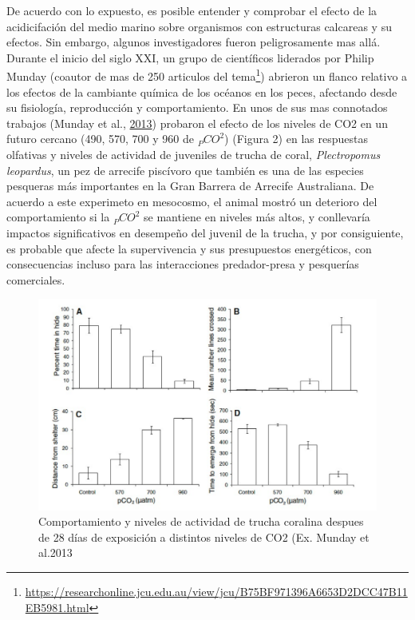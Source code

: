 \documentclass[
]{article}
\begin{document}
De acuerdo con lo expuesto, es posible entender y comprobar el efecto de
la acidicifación del medio marino sobre organismos con estructuras
calcareas y su efectos. Sin embargo, algunos investigadores fueron
peligrosamente mas allá. Durante el inicio del siglo XXI, un grupo de
científicos liderados por Philip Munday (coautor de mas de 250 articulos
del tema\footnote{\url{https://researchonline.jcu.edu.au/view/jcu/B75BF971396A6653D2DCC47B11EB5981.html}})
abrieron un flanco relativo a los efectos de la cambiante química de los
océanos en los peces, afectando desde su fisiología, reproducción y
comportamiento. En unos de sus mas connotados trabajos (Munday et al.,
\protect\hyperlink{ref-Munday2013}{2013}) probaron el efecto de los
niveles de CO2 en un futuro cercano (490, 570, 700 y 960 de \(_PCO^2\))
(Figura 2) en las respuestas olfativas y niveles de actividad de
juveniles de trucha de coral, \emph{Plectropomus leopardus}, un pez de
arrecife piscívoro que también es una de las especies pesqueras más
importantes en la Gran Barrera de Arrecife Australiana. De acuerdo a
este experimeto en mesocosmo, el animal mostró un deterioro del
comportamiento si la \(_PCO^2\) se mantiene en niveles más altos, y
conllevaría impactos significativos en desempeño del juvenil de la
trucha, y por consiguiente, es probable que afecte la supervivencia y
sus presupuestos energéticos, con consecuencias incluso para las
interacciones predador-presa y pesquerías comerciales.

\begin{figure}

{\centering \includegraphics[width=1\linewidth]{images/Fig2} 

}

\caption{Comportamiento y niveles de actividad de trucha coralina despues de 28 días de exposición a distintos niveles de CO2 (Ex. Munday et al.2013}\label{fig:unnamed-chunk-2}
\end{figure}
\end{document}

